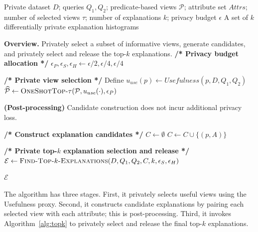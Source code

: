 \begin{algorithm}[t]
\caption{Private-Queries-Diff-Top-$k$-Explanation}
\label{alg:main}
\begin{algorithmic}[1]
\Require Private dataset $D$; queries $Q_1, Q_2$; predicate-based views $\mathcal{P}$; attribute set $Attrs$; number of selected views $\tau$; number of explanations $k$; privacy budget $\epsilon$
\Ensure A set of $k$ differentially private explanation histograms

\Statex \textbf{Overview.} Privately select a subset of informative views, generate candidates, and privately select and release the top-$k$ explanations.
\State \textbf{/* Privacy budget allocation */}
\State $\epsilon_P, \epsilon_S, \epsilon_H  \gets \epsilon/2, \epsilon/4, \epsilon/4$

\State \textbf{/* Private view selection */}
\State Define $u_{use}(p) \gets Usefulness(p, D, Q_1, Q_2)$
\State $\widehat{\mathcal{P}} \gets \textsc{OneShotTop-}\tau(\mathcal{P}, u_{use}(\cdot), \epsilon_P)$ 

\Statex \textbf{(Post-processing)} Candidate construction does not incur additional privacy loss.

\State \textbf{/* Construct explanation candidates */}
\State $C \gets \emptyset$
        \State $C \gets C \cup \{(p,A)\}$
    \EndFor
\EndFor

\State \textbf{/* Private top-$k$ explanation selection and release */}
\State $\mathcal{E} \gets \textsc{Find-Top-$k$-Explanations}(D,Q_1,Q_2,C,k,\epsilon_S,\epsilon_H)$

\Return $\mathcal{E}$
\end{algorithmic}
\end{algorithm}

The algorithm has three stages.
First, it privately selects useful views using the Usefulness proxy.
Second, it constructs candidate explanations by pairing each selected view with each attribute; this is post-processing.
Third, it invokes Algorithm~\ref{alg:topk} to privately select and release the final top-$k$ explanations.


